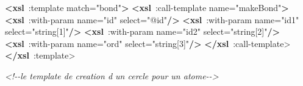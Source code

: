 \documentclass[
]{book}
\newenvironment{Shaded}{\begin{snugshade}}{\end{snugshade}}
\newcommand{\CommentTok}[1]{\textcolor[rgb]{0.56,0.35,0.01}{\textit{#1}}}
\newcommand{\KeywordTok}[1]{\textcolor[rgb]{0.13,0.29,0.53}{\textbf{#1}}}
\newcommand{\NormalTok}[1]{#1}
\newcommand{\OtherTok}[1]{\textcolor[rgb]{0.56,0.35,0.01}{#1}}
\newcommand{\StringTok}[1]{\textcolor[rgb]{0.31,0.60,0.02}{#1}}
\begin{document}
\begin{Shaded}
\begin{Highlighting}[]
  \KeywordTok{\textless{}xsl}\OtherTok{ :template match=}\StringTok{"bond"}\KeywordTok{\textgreater{}}
    \KeywordTok{\textless{}xsl}\OtherTok{ :call{-}template name=}\StringTok{"makeBond"}\KeywordTok{\textgreater{}}
      \KeywordTok{\textless{}xsl}\OtherTok{ :with{-}param name=}\StringTok{"id"}
\OtherTok{        select=}\StringTok{"@id"}\KeywordTok{/\textgreater{}}
      \KeywordTok{\textless{}xsl}\OtherTok{ :with{-}param name=}\StringTok{"id1"}
\OtherTok{        select=}\StringTok{"string[1]"}\KeywordTok{/\textgreater{}}
      \KeywordTok{\textless{}xsl}\OtherTok{ :with{-}param name=}\StringTok{"id2"}
\OtherTok{        select=}\StringTok{"string[2]"}\KeywordTok{/\textgreater{}}
      \KeywordTok{\textless{}xsl}\OtherTok{ :with{-}param name=}\StringTok{"ord"}
\OtherTok{        select=}\StringTok{"string[3]"}\KeywordTok{/\textgreater{}}
    \KeywordTok{\textless{}/xsl}\NormalTok{ :call{-}template\textgreater{}}
  \KeywordTok{\textless{}/xsl}\NormalTok{ :template\textgreater{}}


  \CommentTok{\textless{}!{-}{-}le template de creation d un cercle pour un atome{-}{-}\textgreater{}}


\end{Highlighting}
\end{Shaded}
\end{document}
